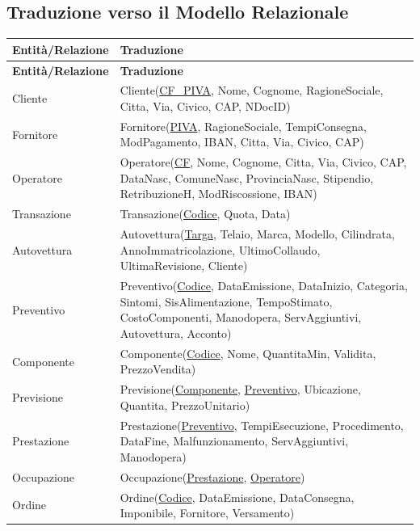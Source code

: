 	\subsection{Traduzione verso il Modello Relazionale}

	\vspace{2ex}
		\begin{longtable}{| p{3cm} | p{11.5cm} |}
			\hline
			\textbf{Entità/Relazione} & \textbf{Traduzione} \\
			\hline
			\endfirsthead

			\hline
			\textbf{Entità/Relazione} & \textbf{Traduzione} \\
			\hline
			\endhead

			Cliente & 
				Cliente(\underline{CF\_PIVA}, Nome, Cognome, RagioneSociale, Citta, Via, Civico, CAP, NDocID) \\
				\hline
			Fornitore &
				Fornitore(\underline{PIVA}, RagioneSociale, TempiConsegna, ModPagamento, IBAN, Citta, Via, Civico, CAP) \\
				\hline
			Operatore &
				Operatore(\underline{CF}, Nome, Cognome, Citta, Via, Civico, CAP, DataNasc, ComuneNasc, ProvinciaNasc, Stipendio, RetribuzioneH, ModRiscossione, IBAN) \\
				\hline
			Transazione &
				Transazione(\underline{Codice}, Quota, Data) \\
				\hline
			Autovettura &
				Autovettura(\underline{Targa}, Telaio, Marca, Modello, Cilindrata, AnnoImmatricolazione, UltimoCollaudo, UltimaRevisione, Cliente) \\
				\hline
			Preventivo &
				Preventivo(\underline{Codice}, DataEmissione, DataInizio, Categoria, Sintomi, SisAlimentazione, TempoStimato, CostoComponenti, Manodopera, ServAggiuntivi, Autovettura, Acconto) \\
				\hline
			Componente & 
				Componente(\underline{Codice}, Nome, QuantitaMin, Validita, PrezzoVendita) \\
				\hline
			Previsione &
				Previsione(\underline{Componente}, \underline{Preventivo}, Ubicazione, Quantita, PrezzoUnitario) \\
				\hline
			Prestazione &
				Prestazione(\underline{Preventivo}, TempiEsecuzione, Procedimento, DataFine, Malfunzionamento, ServAggiuntivi, Manodopera) \\
				\hline
			Occupazione &
				Occupazione(\underline{Prestazione}, \underline{Operatore}) \\
				\hline
			Ordine &
				Ordine(\underline{Codice}, DataEmissione, DataConsegna, Imponibile, Fornitore, Versamento) \\

\end{longtable}
